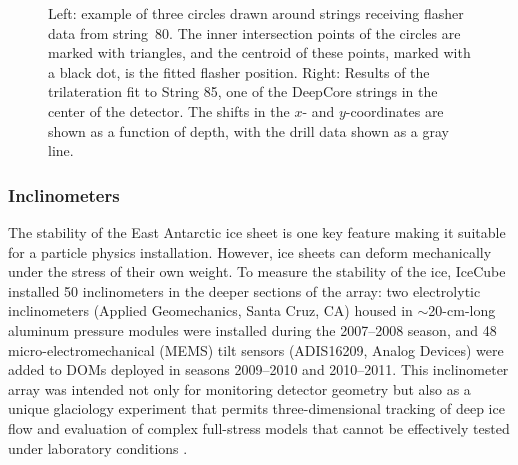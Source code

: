 \begin{figure}[!ht]
  \captionsetup[subfigure]{labelformat=empty} \centering
  \caption{Left: example of three circles drawn around strings
    receiving flasher data from string~80. The inner intersection
    points of the circles are marked with triangles, and the centroid
    of these points, marked with a black dot, is the fitted flasher
    position.  Right: Results of the trilateration fit to String 85, one of
    the DeepCore strings in the center of the detector. The shifts in the
    $x$- and $y$-coordinates are shown as a function of depth, with the drill
    data shown as a gray line.}
  \label{fig:trilateration}
\end{figure}


\subsubsection{Inclinometers}

The stability of the East Antarctic ice sheet is one key feature making it
suitable for a particle physics installation.  However, ice sheets can
deform mechanically under the stress of their own weight.  To measure the
stability of the ice, IceCube installed 50
inclinometers in the deeper sections of the array: two 
electrolytic inclinometers (Applied Geomechanics, Santa Cruz, CA)
housed in $\sim$20-cm-long aluminum pressure modules were installed during
the 2007--2008 season, and 48 micro-electromechanical (MEMS) tilt sensors
(ADIS16209, Analog Devices) were added to DOMs deployed in seasons
2009--2010 and 2010--2011.  This inclinometer array was intended not only for monitoring
detector geometry but also as a unique glaciology experiment that
permits three-dimensional tracking of deep ice flow and evaluation of complex
full-stress models that cannot be effectively tested under laboratory
conditions \cite{pattyn03}.

